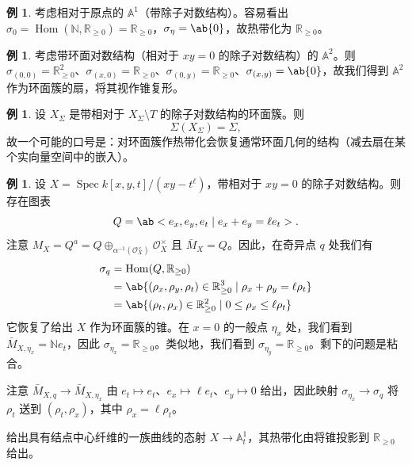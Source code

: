 \documentclass{amsart}
\theoremstyle{definition}
\newtheorem{exm}[thm]{例}
\theoremstyle{remark}
\theoremstyle{plain}
\theoremstyle{definition}
\theoremstyle{remark}
\newcommand{\A}{\mathbb{A}}
\newcommand{\N}{\mathbb{N}}
\newcommand{\R}{\mathbb{R}}
\newcommand{\mc}[1]{\mathcal{#1}}
\newcommand{\1}{\mathbf{1}}
\newcommand{\2}{\mathbf{2}}
\newcommand{\3}{\mathbf{3}}
\DeclareMathOperator{\Hom}{Hom}
\DeclareMathOperator{\Spec}{Spec}
\begin{document}
\begin{exm}
    考虑相对于原点的 \(\A^1\)（带除子对数结构）。容易看出 \(\sigma_0 = \Hom(\N, \R_{\geq 0}) = \R_{\geq 0}\)，\(\sigma_{\eta} = \ab\{0\}\)，故热带化为 \(\R_{\geq 0}\)。
\end{exm}

\begin{exm}
    考虑带环面对数结构（相对于 \(xy = 0\) 的除子对数结构）的 \(\A^2\)。则 \(\sigma_{(0,0)} = \R^2_{\geq 0}\)、\(\sigma_{(x,0)} = \R_{\geq 0}\)、\(\sigma_{(0,y)} = \R_{\geq 0}\)、\(\sigma_{(x,y)} = \ab\{0\}\)，故我们得到 \(\A^2\) 作为环面簇的扇，将其视作锥复形。
\end{exm}

\begin{exm}
    设 \(X_{\Sigma}\) 是带相对于 \(X_{\Sigma} \setminus T\) 的除子对数结构的环面簇。则
    \[ \Sigma(X_{\Sigma}) = \Sigma, \]
    故一个可能的口号是：对环面簇作热带化会恢复通常环面几何的结构（减去扇在某个实向量空间中的嵌入）。
\end{exm}

\begin{exm}
    设 \(X = \Spec k[x,y,t]/(xy-t^{\ell})\)，带相对于 \(xy = 0\) 的除子对数结构。则存在图表
    \[ Q = \ab<e_x, e_y, e_t \mid e_x + e_y = \ell e_t>. \]
    注意 \(M_X = Q^a = Q \oplus_{\alpha^{-1}(\mc{O}_X^{\times})} \mc{O}_X^{\times}\) 且 \(\bar{M}_X = Q\)。因此，在奇异点 \(q\) 处我们有
    \begin{align*}
        \sigma_q &= \Hom(Q, \R_{\geq 0}) \\
        &= \ab\{ (\rho_x, \rho_y, \rho_t) \in \R_{\geq 0}^3 \mid \rho_x + \rho_y = \ell \rho_t \} \\
        &= \ab\{ (\rho_t, \rho_x) \in \R_{\geq 0}^2 \mid 0 \leq \rho_x \leq \ell \rho_t \}
    \end{align*}
    它恢复了给出 \(X\) 作为环面簇的锥。在 \(x = 0\) 的一般点 \(\eta_x\) 处，我们看到 \(\bar{M}_{X, \eta_x} = \N e_t\)，因此 \(\sigma_{\eta_x} = \R_{\geq 0}\)。类似地，我们看到 \(\sigma_{\eta_y} = \R_{\geq 0}\)。剩下的问题是粘合。

    注意 \(\bar{M}_{X, q} \to \bar{M}_{X, \eta_x}\) 由 \(e_t \mapsto e_t\)、\(e_x \mapsto \ell e_t\)、\(e_y \mapsto 0\) 给出，因此映射 \(\sigma_{\eta_x} \to \sigma_q\) 将 \(\rho_t\) 送到 \((\rho_t, \rho_x)\)，其中 \(\rho_x = \ell \rho_t\)。

    给出具有结点中心纤维的一族曲线的态射 \(X \to \A^1_t\)，其热带化由将锥投影到 \(\R_{\geq 0}\) 给出。
\end{exm}
\end{document}
